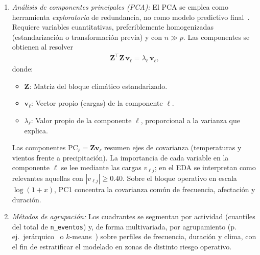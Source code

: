 \begin{enumerate}
    \item \textit{Análisis de componentes principales (PCA):}
    El PCA se emplea como herramienta \emph{exploratoria} de redundancia, no como modelo predictivo final~\cite{ref58}. Requiere variables cuantitativas, preferiblemente homogenizadas (estandarización o transformación previa) y con $n\gg p$. Las componentes se obtienen al resolver
    \begin{equation}
        \begin{aligned}
        \mathbf{Z}^{\top}\mathbf{Z}\,\mathbf{v}_{\ell} = \lambda_{\ell}\,\mathbf{v}_{\ell},
        \end{aligned}
        \label{eq:pca}
    \end{equation}
    donde:
    \begin{itemize}
        \item $\mathbf{Z}$: Matriz del bloque climático estandarizado.
        \item $\mathbf{v}_{\ell}$: Vector propio (cargas) de la componente $\ell$.
        \item $\lambda_{\ell}$: Valor propio de la componente $\ell$, proporcional a la varianza que explica.
    \end{itemize}
    Las componentes $\mathrm{PC}_{\ell}=\mathbf{Z}\mathbf{v}_{\ell}$ resumen ejes de covarianza (temperaturas y vientos frente a precipitación). La importancia de cada variable en la componente $\ell$ se lee mediante las cargas $v_{\ell j}$; en el EDA se interpretan como relevantes aquellas con $|v_{\ell j}|\geq 0{.}40$. Sobre el bloque operativo en escala $\log(1+x)$, PC1 concentra la covarianza común de frecuencia, afectación y duración.

    \item \textit{Métodos de agrupación:}
    Los cuadrantes se segmentan por actividad (cuantiles del total de \texttt{n\_eventos}) y, de forma multivariada, por agrupamiento (p.\,ej.\ jerárquico~\cite{ref60} o $k$-means~\cite{ref59}) sobre perfiles de frecuencia, duración y clima, con el fin de estratificar el modelado en zonas de distinto riesgo operativo.


\end{enumerate}
